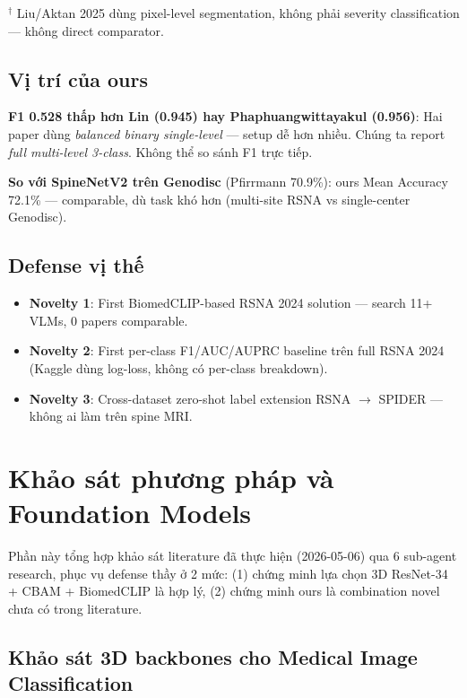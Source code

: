 \documentclass[11pt,a4paper]{article}
\begin{document}
\noindent$^\dagger$ Liu/Aktan 2025 dùng pixel-level segmentation, không
phải severity classification --- không direct comparator.

\subsection{Vị trí của ours}

\noindent\textbf{F1 0.528 thấp hơn Lin (0.945) hay Phaphuangwittayakul
(0.956)}: Hai paper dùng \emph{balanced binary single-level} --- setup
dễ hơn nhiều. Chúng ta report \emph{full multi-level 3-class}. Không thể
so sánh F1 trực tiếp.

\noindent\textbf{So với SpineNetV2 trên Genodisc} (Pfirrmann 70.9\%):
ours Mean Accuracy 72.1\% --- comparable, dù task khó hơn (multi-site
RSNA vs single-center Genodisc).

\subsection{Defense vị thế}

\begin{itemize}[leftmargin=*]
\item \textbf{Novelty 1}: First BiomedCLIP-based RSNA 2024 solution
--- search 11+ VLMs, 0 papers comparable.
\item \textbf{Novelty 2}: First per-class F1/AUC/AUPRC baseline trên
full RSNA 2024 (Kaggle dùng log-loss, không có per-class breakdown).
\item \textbf{Novelty 3}: Cross-dataset zero-shot label extension RSNA
$\to$ SPIDER --- không ai làm trên spine MRI.
\end{itemize}

\section{Khảo sát phương pháp và Foundation Models}
\label{sec:survey}

\noindent Phần này tổng hợp khảo sát literature đã thực hiện
(2026-05-06) qua 6 sub-agent research, phục vụ defense thầy ở 2 mức:
(1) chứng minh lựa chọn 3D ResNet-34 + CBAM + BiomedCLIP là hợp lý,
(2) chứng minh ours là combination novel chưa có trong literature.

\subsection{Khảo sát 3D backbones cho Medical Image Classification}
\end{document}
